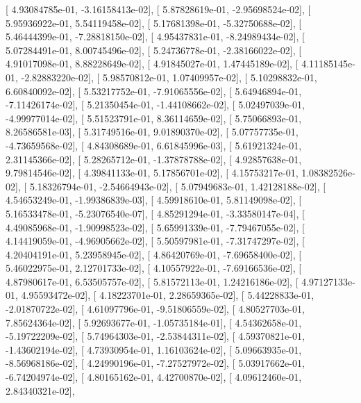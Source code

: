 \documentclass{article}
\begin{document}
       [  4.93084785e-01,  -3.16158413e-02],
       [  5.87828619e-01,  -2.95698524e-02],
       [  5.95936922e-01,   5.54119458e-02],
       [  5.17681398e-01,  -5.32750688e-02],
       [  5.46444399e-01,  -7.28818150e-02],
       [  4.95437831e-01,  -8.24989434e-02],
       [  5.07284491e-01,   8.00745496e-02],
       [  5.24736778e-01,  -2.38166022e-02],
       [  4.91017098e-01,   8.88228649e-02],
       [  4.91845027e-01,   1.47445189e-02],
       [  4.11185145e-01,  -2.82883220e-02],
       [  5.98570812e-01,   1.07409957e-02],
       [  5.10298832e-01,   6.60840092e-02],
       [  5.53217752e-01,  -7.91065556e-02],
       [  5.64946894e-01,  -7.11426174e-02],
       [  5.21350454e-01,  -1.44108662e-02],
       [  5.02497039e-01,  -4.99977014e-02],
       [  5.51523791e-01,   8.36114659e-02],
       [  5.75066893e-01,   8.26586581e-03],
       [  5.31749516e-01,   9.01890370e-02],
       [  5.07757735e-01,  -4.73659568e-02],
       [  4.84308689e-01,   6.61845996e-03],
       [  5.61921324e-01,   2.31145366e-02],
       [  5.28265712e-01,  -1.37878788e-02],
       [  4.92857638e-01,   9.79814546e-02],
       [  4.39841133e-01,   5.17856701e-02],
       [  4.15753217e-01,   1.08382526e-02],
       [  5.18326794e-01,  -2.54664943e-02],
       [  5.07949683e-01,   1.42128188e-02],
       [  4.54653249e-01,  -1.99386839e-03],
       [  4.59918610e-01,   5.81149098e-02],
       [  5.16533478e-01,  -5.23076540e-07],
       [  4.85291294e-01,  -3.33580147e-04],
       [  4.49085968e-01,  -1.90998523e-02],
       [  5.65991339e-01,  -7.79467055e-02],
       [  4.14419059e-01,  -4.96905662e-02],
       [  5.50597981e-01,  -7.31747297e-02],
       [  4.20404191e-01,   5.23958945e-02],
       [  4.86420769e-01,  -7.69658400e-02],
       [  5.46022975e-01,   2.12701733e-02],
       [  4.10557922e-01,  -7.69166536e-02],
       [  4.87980617e-01,   6.53505757e-02],
       [  5.81572113e-01,   1.24216186e-02],
       [  4.97127133e-01,   4.95593472e-02],
       [  4.18223701e-01,   2.28659365e-02],
       [  5.44228833e-01,  -2.01870722e-02],
       [  4.61097796e-01,  -9.51806559e-02],
       [  4.80527703e-01,   7.85624364e-02],
       [  5.92693677e-01,  -1.05735184e-01],
       [  4.54362658e-01,  -5.19722209e-02],
       [  5.74964303e-01,  -2.53844311e-02],
       [  4.59370821e-01,  -1.43602194e-02],
       [  4.73930954e-01,   1.16103624e-02],
       [  5.09663935e-01,  -8.56968186e-02],
       [  4.24990196e-01,  -7.27527972e-02],
       [  5.03917662e-01,  -6.74204974e-02],
       [  4.80165162e-01,   4.42700870e-02],
       [  4.09612460e-01,   2.84340321e-02],
\end{document}

